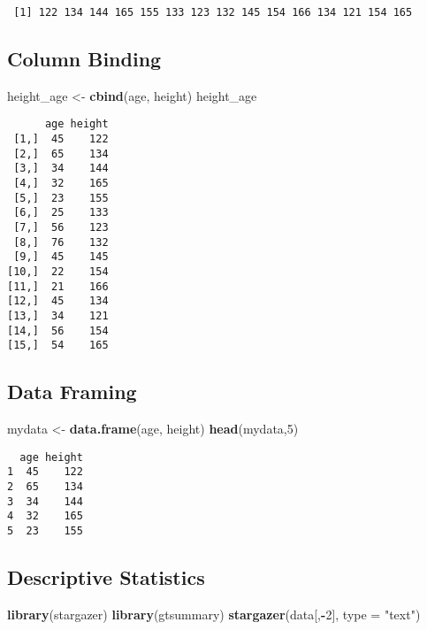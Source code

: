 \documentclass[
]{article}
\newenvironment{Shaded}{\begin{snugshade}}{\end{snugshade}}
\newcommand{\AttributeTok}[1]{\textcolor[rgb]{0.13,0.29,0.53}{#1}}
\newcommand{\DecValTok}[1]{\textcolor[rgb]{0.00,0.00,0.81}{#1}}
\newcommand{\FunctionTok}[1]{\textcolor[rgb]{0.13,0.29,0.53}{\textbf{#1}}}
\newcommand{\NormalTok}[1]{#1}
\newcommand{\OtherTok}[1]{\textcolor[rgb]{0.56,0.35,0.01}{#1}}
\newcommand{\SpecialCharTok}[1]{\textcolor[rgb]{0.81,0.36,0.00}{\textbf{#1}}}
\newcommand{\StringTok}[1]{\textcolor[rgb]{0.31,0.60,0.02}{#1}}
\begin{document}
\begin{verbatim}
 [1] 122 134 144 165 155 133 123 132 145 154 166 134 121 154 165
\end{verbatim}

\hypertarget{column-binding}{%
\subsection{Column Binding}\label{column-binding}}

\begin{Shaded}
\begin{Highlighting}[]
\NormalTok{height\_age }\OtherTok{\textless{}{-}} \FunctionTok{cbind}\NormalTok{(age, height)}
\NormalTok{height\_age}
\end{Highlighting}
\end{Shaded}

\begin{verbatim}
      age height
 [1,]  45    122
 [2,]  65    134
 [3,]  34    144
 [4,]  32    165
 [5,]  23    155
 [6,]  25    133
 [7,]  56    123
 [8,]  76    132
 [9,]  45    145
[10,]  22    154
[11,]  21    166
[12,]  45    134
[13,]  34    121
[14,]  56    154
[15,]  54    165
\end{verbatim}

\hypertarget{data-framing}{%
\subsection{Data Framing}\label{data-framing}}

\begin{Shaded}
\begin{Highlighting}[]
\NormalTok{mydata }\OtherTok{\textless{}{-}} \FunctionTok{data.frame}\NormalTok{(age, height)}
\FunctionTok{head}\NormalTok{(mydata,}\DecValTok{5}\NormalTok{)}
\end{Highlighting}
\end{Shaded}

\begin{verbatim}
  age height
1  45    122
2  65    134
3  34    144
4  32    165
5  23    155
\end{verbatim}

\hypertarget{descriptive-statistics}{%
\subsection{Descriptive Statistics}\label{descriptive-statistics}}

\begin{Shaded}
\begin{Highlighting}[]
\FunctionTok{library}\NormalTok{(stargazer)}
\FunctionTok{library}\NormalTok{(gtsummary)}
\FunctionTok{stargazer}\NormalTok{(data[,}\SpecialCharTok{{-}}\DecValTok{2}\NormalTok{], }\AttributeTok{type =} \StringTok{"text"}\NormalTok{)}
\end{Highlighting}
\end{Shaded}
\end{document}
